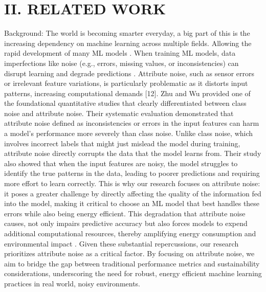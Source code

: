 \documentclass[conference]{IEEEtran}
\begin{document}
\section*{II. RELATED WORK}
Background: The world is becoming smarter everyday, a big part of this is the increasing dependency on machine learning across multiple fields. Allowing the rapid development of many ML models \cite{bain_ai_sustainability}. When training ML models, data imperfections like noise (e.g., errors, missing values, or inconsistencies) can disrupt learning and degrade predictions \cite{sciencedirect_noise}. Attribute noise, such as sensor errors or irrelevant feature variations, is particularly problematic as it distorts input patterns, increasing computational demands [12].\newline
\newline
Zhu and Wu \cite{wuzu} provided one of the foundational quantitative studies that clearly differentiated between class noise and attribute noise. Their systematic evaluation demonstrated that attribute noise defined as inconsistencies or errors in the input features can harm a model's performance more severely than class noise. Unlike class noise, which involves incorrect labels that might just mislead the model during training, attribute noise directly corrupts the data that the model learns from. Their study also showed that when the input features are noisy, the model struggles to identify the true patterns in the data, leading to poorer predictions and requiring more effort to learn correctly. This is why our research focuses on attribute noise: it poses a greater challenge by directly affecting the quality of the information fed into the model, making it critical to choose an ML model that best handles these errors while also being energy efficient.
\newline
\newline
This degradation that attribute noise causes, not only impairs predictive accuracy but also forces models to expend additional computational resources, thereby amplifying energy consumption and environmental impact \cite{wuzu}. Given these substantial repercussions, our research prioritizes attribute noise as a critical factor. By focusing on attribute noise, we aim to bridge the gap between traditional performance metrics and sustainability considerations, underscoring the need for robust, energy efficient machine learning practices in real world, noisy environments.
\end{document}
